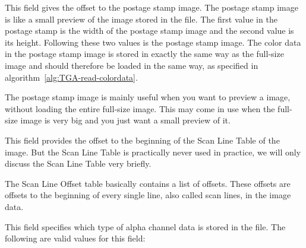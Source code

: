 
This field gives the offset to the postage stamp image. The postage
stamp image is like a small preview of the image stored in the
file. The first value in the postage stamp is the width of the postage
stamp image and the second value is its height. Following these two
values is the postage stamp image. The color data in the postage stamp
image is stored in exactly the same way as the full-size image and
should therefore be loaded in the same way, as specified in
algorithm~\ref{alg:TGA-read-colordata}.

The postage stamp image is mainly useful when you want to preview a
\tga image, without loading the entire full-size image. This may come
in use when the full-size image is very big and you just want a small
preview of it.


This field provides the offset to the beginning of the Scan Line Table
of the image. But the Scan Line Table is practically never used in
practice, we will only discuss the Scan Line Table very briefly.

The Scan Line Offset table basically contains a list of offsets. These
offsets are offsets to the beginning of every single line, also called
scan lines, in the image data.


This field specifies which type of alpha channel data is stored in the
file. The following are valid values for this field:


